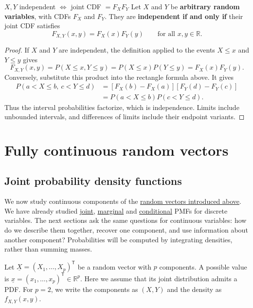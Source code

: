 \documentclass[a4paper,12pt,oneside]{report}
\begin{document}
\begin{framedprop}{$X,Y$ independent $\Longleftrightarrow$ joint CDF $=F_XF_Y$}
\label{prop:independence-cdf}
Let $X$ and $Y$ be \textbf{arbitrary random variables}, with
CDFs $F_X$ and $F_Y$. They are \textbf{independent if and only if}
their joint CDF satisfies
\[
  F_{X,Y}(x,y)=F_X(x)F_Y(y)
  \qquad\text{for all }x,y\in\mathbb R.
\]
\end{framedprop}
\begin{proof}
If $X$ and $Y$ are independent, the definition applied to the
events $X\leq x$ and $Y\leq y$ gives
\[
  F_{X,Y}(x,y)=P(X\leq x,Y\leq y)
             =P(X\leq x)P(Y\leq y)=F_X(x)F_Y(y).
\]
Conversely, substitute this product into the rectangle formula
above. It gives
\begin{align*}
  P(a<X\leq b,\ c<Y\leq d)
    &=[F_X(b)-F_X(a)][F_Y(d)-F_Y(c)]\\
    &=P(a<X\leq b)P(c<Y\leq d).
\end{align*}
Thus the interval probabilities factorize, which is independence.
Limits include unbounded intervals, and differences of limits
include their endpoint variants.
\end{proof}

\clearpage
\section{Fully continuous random vectors}
\label{sec:continuous-mixed-random-vectors}
\label{sec:fully-continuous-random-vectors}

\subsection{Joint probability density functions}
\label{sec:joint-pdf-continuous}

We now study continuous components of the
\hyperref[chap:random-vectors]{random vectors introduced above}.
We have already studied
\hyperref[sec:joint-pmf]{joint},
\hyperref[sec:marginal-pmf]{marginal} and
\hyperref[sec:conditional-pmf]{conditional} PMFs for discrete variables.
The next sections ask the same questions for continuous variables:
how do we describe them together, recover one component, and use
information about another component? Probabilities will be computed
by integrating densities, rather than summing masses.

Let $\underline{X}=(X_1,\ldots,X_p)^{\mathsf T}$ be a random vector
with $p$ components. A possible value is
$\underline{x}=(x_1,\ldots,x_p)^{\mathsf T}\in\mathbb R^p$.
Here we assume that its joint distribution admits a PDF.
For $p=2$, we write the components as $(X,Y)$ and the density as
$f_{X,Y}(x,y)$.
\end{document}
